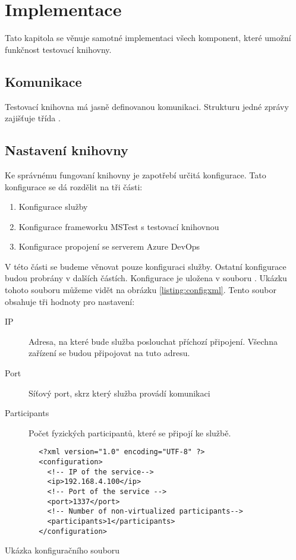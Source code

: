 \chapter{Implementace}


Tato kapitola se věnuje samotné implementaci všech komponent, které umožní funkčnost testovací knihovny.

\section{Komunikace}
Testovací knihovna má jasně definovanou komunikaci. Strukturu jedné zprávy zajišťuje třída . 

\section{Nastavení knihovny}
Ke správnému fungovaní knihovny je zapotřebí určitá konfigurace. Tato konfigurace se dá rozdělit na tři části:
\begin{enumerate}
    \item Konfigurace služby
    \item Konfigurace frameworku MSTest s testovací knihovnou
    \item Konfigurace propojení se serverem Azure DevOps
\end{enumerate}

V této části se budeme věnovat pouze konfiguraci služby. Ostatní konfigurace budou probrány v dalších částích. Konfigurace je uložena v souboru . Ukázku tohoto souboru můžeme vidět na obrázku \ref{listing:configxml}. Tento soubor obsahuje tři hodnoty pro nastavení:

\begin{description}
    \item[IP] Adresa, na které bude služba poslouchat příchozí připojení. Všechna zařízení se budou připojovat na tuto adresu.
    \item[Port] Síťový port, skrz který služba provádí komunikaci
    \item[Participants] Počet fyzických participantů, které se připojí ke službě.   
\end{description}

\begin{listing}
    \begin{verbatim}
        <?xml version="1.0" encoding="UTF-8" ?>
        <configuration>
          <!-- IP of the service-->
          <ip>192.168.4.100</ip>
          <!-- Port of the service -->
          <port>1337</port>
          <!-- Number of non-virtualized participants-->
          <participants>1</participants>
        </configuration>
    \end{verbatim}
    \caption{Ukázka konfiguračního souboru}
    \label{listing:configxml}
\end{listing}


